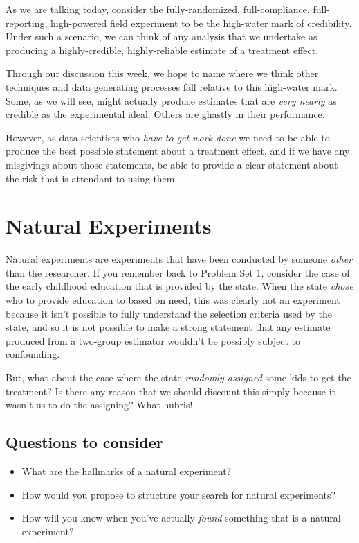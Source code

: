 \documentclass[
]{book}
\providecommand{\tightlist}{%
  \setlength{\itemsep}{0pt}\setlength{\parskip}{0pt}}
\begin{document}
As we are talking today, consider the fully-randomized, full-compliance,
full-reporting, high-powered field experiment to be the high-water mark
of credibility. Under such a scenario, we can think of any analysis that
we undertake as producing a highly-credible, highly-reliable estimate of
a treatment effect.

Through our discussion this week, we hope to name where we think other
techniques and data generating processes fall relative to this
high-water mark. Some, as we will see, might actually produce estimates
that are \emph{very nearly} as credible as the experimental ideal.
Others are ghastly in their performance.

However, as data scientists who \emph{have to get work done} we need to
be able to produce the best possible statement about a treatment effect,
and if we have any misgivings about those statements, be able to provide
a clear statement about the risk that is attendant to using them.

\hypertarget{natural-experiments}{%
\section{Natural Experiments}\label{natural-experiments}}

Natural experiments are experiments that have been conducted by someone
\emph{other} than the researcher. If you remember back to Problem Set 1,
consider the case of the early childhood education that is provided by
the state. When the state \emph{chose} who to provide education to based
on need, this was clearly not an experiment because it isn't possible to
fully understand the selection criteria used by the state, and so it is
not possible to make a strong statement that any estimate produced from
a two-group estimator wouldn't be possibly subject to confounding.

But, what about the case where the state \emph{randomly assigned} some
kids to get the treatment? Is there any reason that we should discount
this simply because it wasn't us to do the assigning? What hubris!

\hypertarget{questions-to-consider}{%
\subsection{Questions to consider}\label{questions-to-consider}}

\begin{itemize}
\tightlist
\item
  What are the hallmarks of a natural experiment?
\item
  How would you propose to structure your search for natural
  experiments?
\item
  How will you know when you've actually \emph{found} something that is
  a natural experiment?
\end{itemize}
\end{document}
